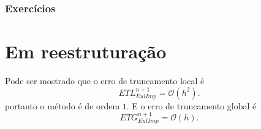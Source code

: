 
%



\emconstrucao

\subsection*{Exercícios}

\emconstrucao




\chapter{Em reestruturação}

Pode ser mostrado que o erro de truncamento local é
\begin{equation} ETL_{EulImp}^{n+1}= \mathcal{O}(h^2). \end{equation}
portanto o método é de ordem $1$. E o erro de truncamento global é
\begin{equation} ETG_{EulImp}^{n+1}= \mathcal{O}(h). \end{equation}



